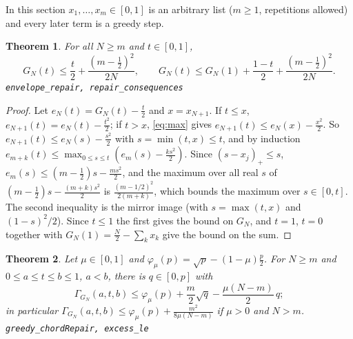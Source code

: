 \documentclass[11pt]{amsart}
\newtheorem{theorem}{Theorem}
\theoremstyle{remark}
\newcommand{\lean}[1]{\texttt{\small #1}}
\begin{document}
In this section $x_1,\dots,x_m\in[0,1]$ is an arbitrary list ($m\ge1$, repetitions
allowed) and every later term is a greedy step.

\begin{theorem}\label{thm:repair}
For all $N\ge m$ and $t\in[0,1]$,
\[
G_N(t)\le\frac t2+\frac{(m-\frac12)^2}{2N},\qquad
G_N(t)\le G_N(1)+\frac{1-t}2+\frac{(m-\frac12)^2}{2N}.
\]
\lean{envelope\_repair, repair\_consequences}
\end{theorem}

\begin{proof}
Let $e_N(t)=G_N(t)-\frac t2$ and $x=x_{N+1}$. If $t\le x$,
$e_{N+1}(t)=e_N(t)-\frac{t^2}2$; if $t>x$, \eqref{eq:max} gives
$e_{N+1}(t)\le e_N(x)-\frac{x^2}2$. So $e_{N+1}(t)\le e_N(s)-\frac{s^2}2$ with
$s=\min(t,x)\le t$, and by induction
$e_{m+k}(t)\le\max_{0\le s\le t}(e_m(s)-\frac{ks^2}2)$. Since $(s-x_j)_+\le s$,
$e_m(s)\le(m-\frac12)s-\frac{ms^2}2$, and the maximum over all real $s$ of
$(m-\frac12)s-\frac{(m+k)s^2}2$ is $\frac{(m-1/2)^2}{2(m+k)}$, which bounds the
maximum over $s\in[0,t]$. The second inequality is the mirror image (with
$s=\max(t,x)$ and $(1-s)^2/2$). Since $t\le1$ the first gives the bound on $G_N$, and
$t=1$, $t=0$ together with $G_N(1)=\frac N2-\sum_kx_k$ give the bound on the sum.
\end{proof}

\begin{theorem}\label{thm:chordrepair}
Let $\mu\in[0,1]$ and $\varphi_\mu(p)=\sqrt p-(1-\mu)\frac p2$. For $N\ge m$ and
$0\le a\le t\le b\le1$, $a<b$, there is $q\in[0,p]$ with
\[
\Gamma_{G_N}(a,t,b)\le\varphi_\mu(p)+\frac m2\sqrt q-\frac{\mu(N-m)}2\,q ;
\]
in particular $\Gamma_{G_N}(a,t,b)\le\varphi_\mu(p)+\frac{m^2}{8\mu(N-m)}$ if
$\mu>0$ and $N>m$. \lean{greedy\_chordRepair, excess\_le}
\end{theorem}
\end{document}
